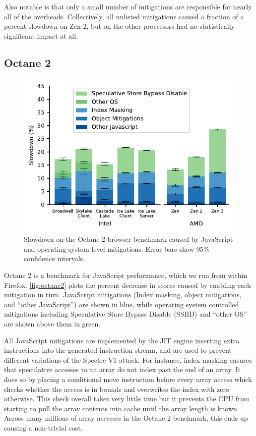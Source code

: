 Also notable is that only a small number of mitigations are responsible for nearly all of the overheads.
Collectively, all unlisted mitigations caused a fraction of a percent slowdown on Zen 2, but on the other processors had no statistically-significant impact at all.

\subsection{Octane 2}
\label{sec:benchmarks:octane-2}

\begin{figure}[t]
    \includegraphics[width=\columnwidth]{plots/octane2.pdf}
    \caption{Slowdown on the Octane 2 browser benchmark caused by JavaScript and operating system level mitigations. Error bars show 95\% confidence intervals.}
    \label{fig:octane2}
\end{figure}

Octane 2 is a benchmark for JavaScript performance, which we run from within Firefox.
\autoref{fig:octane2} plots the percent decrease in scores caused by enabling each mitigation in turn.
JavaScript mitigations (Index masking, object mitigations, and ``other JavaScript'') are shown in blue, while operating system controlled mitigations including Speculative Store Bypass Disable (SSBD) and ``other OS'' are shown above them in green.

All JavaScript mitigations are implemented by the JIT engine inserting extra instructions into the generated instruction stream, and are used to prevent different variations of the Spectre V1 attack.
For instance, index masking ensures that speculative accesses to an array do not index past the end of an array.
It does so by placing a conditional move instruction before every array access which checks whether the access is in bounds and overwrites the index with zero otherwise.
This check overall takes very little time but it prevents the CPU from starting to pull the array contents into cache until the array length is known.
Across many millions of array accesses in the Octane 2 benchmark, this ends up causing a non-trivial cost.

